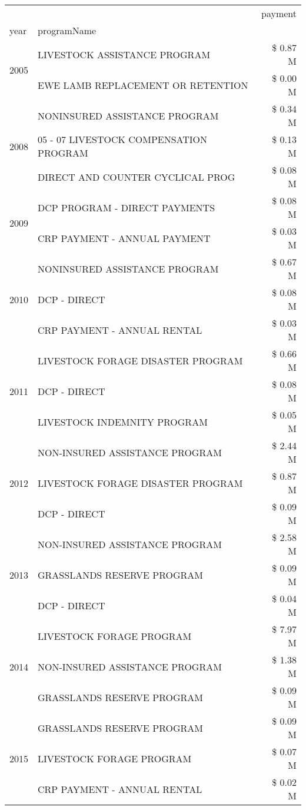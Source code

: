 \begin{tabular}{llr}
\toprule
 &  & payment \\
year & programName &  \\
\midrule
\multirow[t]{2}{*}{2005} & LIVESTOCK ASSISTANCE PROGRAM & \$ 0.87 M \\
 & EWE LAMB REPLACEMENT OR RETENTION & \$ 0.00 M \\
\cline{1-3}
\multirow[t]{3}{*}{2008} & NONINSURED ASSISTANCE PROGRAM & \$ 0.34 M \\
 & 05 - 07 LIVESTOCK COMPENSATION PROGRAM & \$ 0.13 M \\
 & DIRECT AND COUNTER CYCLICAL PROG & \$ 0.08 M \\
\cline{1-3}
\multirow[t]{2}{*}{2009} & DCP PROGRAM - DIRECT PAYMENTS & \$ 0.08 M \\
 & CRP PAYMENT - ANNUAL PAYMENT & \$ 0.03 M \\
\cline{1-3}
\multirow[t]{3}{*}{2010} & NONINSURED ASSISTANCE PROGRAM & \$ 0.67 M \\
 & DCP - DIRECT & \$ 0.08 M \\
 & CRP PAYMENT - ANNUAL RENTAL & \$ 0.03 M \\
\cline{1-3}
\multirow[t]{3}{*}{2011} & LIVESTOCK FORAGE DISASTER PROGRAM & \$ 0.66 M \\
 & DCP - DIRECT & \$ 0.08 M \\
 & LIVESTOCK INDEMNITY PROGRAM & \$ 0.05 M \\
\cline{1-3}
\multirow[t]{3}{*}{2012} & NON-INSURED ASSISTANCE PROGRAM & \$ 2.44 M \\
 & LIVESTOCK FORAGE DISASTER PROGRAM & \$ 0.87 M \\
 & DCP - DIRECT & \$ 0.09 M \\
\cline{1-3}
\multirow[t]{3}{*}{2013} & NON-INSURED ASSISTANCE PROGRAM & \$ 2.58 M \\
 & GRASSLANDS RESERVE PROGRAM & \$ 0.09 M \\
 & DCP - DIRECT & \$ 0.04 M \\
\cline{1-3}
\multirow[t]{3}{*}{2014} & LIVESTOCK FORAGE PROGRAM & \$ 7.97 M \\
 & NON-INSURED ASSISTANCE PROGRAM & \$ 1.38 M \\
 & GRASSLANDS RESERVE PROGRAM & \$ 0.09 M \\
\cline{1-3}
\multirow[t]{3}{*}{2015} & GRASSLANDS RESERVE PROGRAM & \$ 0.09 M \\
 & LIVESTOCK FORAGE PROGRAM & \$ 0.07 M \\
 & CRP PAYMENT - ANNUAL RENTAL & \$ 0.02 M \\

\end{tabular}

